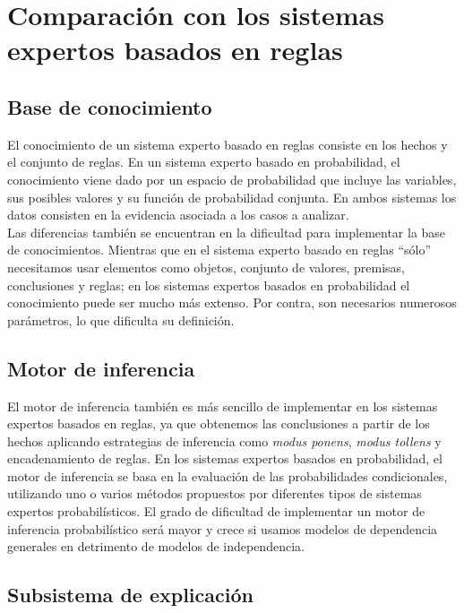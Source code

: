 \documentclass{article}
\theoremstyle{definition_wo_parentheses}
\begin{document}
\section{Comparación con los sistemas expertos basados en reglas}

\subsection{Base de conocimiento}

El conocimiento de un sistema experto basado en reglas consiste en los hechos y el conjunto de reglas. En un sistema experto basado en probabilidad, el conocimiento viene dado por un espacio de probabilidad que incluye las variables, sus posibles valores y su función de probabilidad conjunta. En ambos sistemas los datos consisten en la evidencia asociada a los casos a analizar.\\
Las diferencias también se encuentran en la dificultad para implementar la base de conocimientos. Mientras que en el sistema experto basado en reglas ``sólo'' necesitamos usar elementos como objetos, conjunto de valores, premisas, conclusiones y reglas; en los sistemas expertos basados en probabilidad el conocimiento puede ser mucho más extenso. Por contra, son necesarios numerosos parámetros, lo que dificulta su definición.

\subsection{Motor de inferencia}

El motor de inferencia también es más sencillo de implementar en los sistemas expertos basados en reglas, ya que obtenemos las conclusiones a partir de los hechos aplicando estrategias de inferencia como \textit{modus ponens}, \textit{modus tollens} y encadenamiento de reglas. En los sistemas expertos basados en probabilidad, el motor de inferencia se basa en la evaluación de las probabilidades condicionales, utilizando uno o varios métodos propuestos por diferentes tipos de sistemas expertos probabilísticos. El grado de dificultad de implementar un motor de inferencia probabilístico será mayor y crece si usamos modelos de dependencia generales en detrimento de modelos de independencia.

\subsection{Subsistema de explicación}
\end{document}

